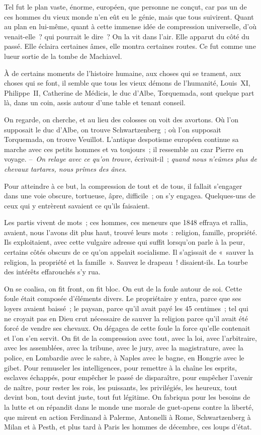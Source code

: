 \documentclass[french,twoside]{book} %
\begin{document}
Tel fut le plan vaste, énorme, européen, que personne ne conçut, car pas un de ces hommes du vieux monde n’en eût eu le génie, mais que tous suivirent. Quant au plan en lui-même, quant à cette immense idée de compression universelle, d’où venait-elle ? qui pourrait le dire ? On la vit dans l’air. Elle apparut du côté du passé. Elle éclaira certaines âmes, elle montra certaines routes. Ce fut comme une lueur sortie de la tombe de Machiavel.\par
À de certains moments de l’histoire humaine, aux choses qui se trament, aux choses qui se font, il semble que tous les vieux démons de l’humanité, Louis XI, Philippe II, Catherine de Médicis, le duc d’Albe, Torquemada, sont quelque part là, dans un coin, assis autour d’une table et tenant conseil.\par
On regarde, on cherche, et au lieu des colosses on voit des avortons. Où l’on supposait le duc d’Albe, on trouve Schwartzenberg ; où l’on supposait Torquemada, on trouve Veuillot. L’antique despotisme européen continue sa marche avec ces petits hommes et va toujours ; il ressemble au czar Pierre en voyage. – \emph{On relaye avec ce qu’on trouve}, écrivait-il ; \emph{quand nous n’eûmes plus de chevaux tartares, nous prîmes des ânes.}\par
Pour atteindre à ce but, la compression de tout et de tous, il fallait s’engager dans une voie obscure, tortueuse, âpre, difficile ; on s’y engagea. Quelques-uns de ceux qui y entrèrent savaient ce qu’ils faisaient.\par
Les partis vivent de mots ; ces hommes, ces meneurs que 1848 effraya et rallia, avaient, nous l’avons dit plus haut, trouvé leurs mots : religion, famille, propriété. Ils exploitaient, avec cette vulgaire adresse qui suffit lorsqu’on parle à la peur, certains côtés obscurs de ce qu’on appelait socialisme. Il s’agissait de « sauver la religion, la propriété et la famille ». Sauvez le drapeau ! disaient-ils. La tourbe des intérêts effarouchés s’y rua.\par
On se coalisa, on fit front, on fit bloc. On eut de la foule autour de soi. Cette foule était composée d’éléments divers. Le propriétaire y entra, parce que ses loyers avaient baissé ; le paysan, parce qu’il avait payé les 45 centimes ; tel qui ne croyait pas en Dieu crut nécessaire de sauver la religion parce qu’il avait été forcé de vendre ses chevaux. On dégagea de cette foule la force qu’elle contenait et l’on s’en servit. On fit de la compression avec tout, avec la loi, avec l’arbitraire, avec les assemblées, avec la tribune, avec le jury, avec la magistrature, avec la police, en Lombardie avec le sabre, à Naples avec le bagne, en Hongrie avec le gibet. Pour remuseler les intelligences, pour remettre à la chaîne les esprits, esclaves échappés, pour empêcher le passé de disparaître, pour empêcher l’avenir de naître, pour rester les rois, les puissants, les privilégiés, les heureux, tout devint bon, tout devint juste, tout fut légitime. On fabriqua pour les besoins de la lutte et on répandit dans le monde une morale de guet-apens contre la liberté, que mirent en action Ferdinand à Palerme, Antonelli à Rome, Schwartzenberg à Milan et à Pesth, et plus tard à Paris les hommes de décembre, ces loups d’état.\par
\end{document}
